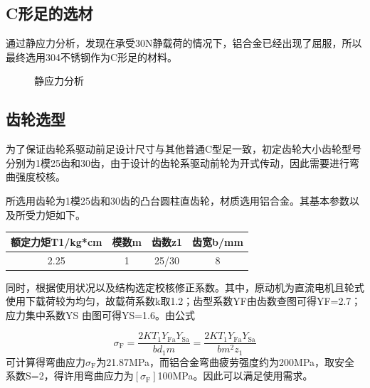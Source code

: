 \documentclass[12pt]{article}
\begin{document}
\begin{CJK}{UTF8}{gbsn}
\subsection{C形足的选材}
通过静应力分析，发现在承受30N静载荷的情况下，铝合金已经出现了屈服，所以最终选用304不锈钢作为C形足的材料。
\begin{figure}[H]
{}
\quad
{}
\caption{静应力分析}
\end{figure}

\subsection{齿轮选型}
为了保证齿轮系驱动前足设计尺寸与其他普通C型足一致，初定齿轮大小齿轮型号分别为1模25齿和30齿，由于设计的齿轮系驱动前轮为开式传动，因此需要进行弯曲强度校核。\par
所选用齿轮为1模25齿和30齿的凸台圆柱直齿轮，材质选用铝合金。其基本参数以及所受力矩如下。\par
\begin{table}[!htbp]
\centering
\begin{tabular}{|c|c|c|c|} %
\hline %
额定力矩T1/kg*cm&模数m&齿数z1&齿宽b/mm\\
\hline
2.25&1&25/30&8\\
\hline
\end{tabular}
\end{table}
同时，根据使用状况以及结构选定校核修正系数。其中，原动机为直流电机且轮式使用下载荷较为均匀，故载荷系数k取1.2；齿型系数YF由齿数查图可得YF=2.7；应力集中系数YS
由图可得YS=1.6。由公式\par
$$\sigma _ { \mathrm { F } } = \frac { 2 K T _ { 1 } Y _ { \mathrm { Fa } } Y _ { \mathrm { Sa } } } { b d _ { 1 } m } = \frac { 2 K T _ { 1 } Y _ { \mathrm { Fa } } Y _ { \mathrm { Sa } } } { b m ^ { 2 } z _ { 1 } } $$
可计算得弯曲应力$\sigma _ { \mathrm { F } } $为21.87MPa，而铝合金弯曲疲劳强度约为200MPa，取安全系数S=2，得许用弯曲应力为$\left[ \sigma _ { \mathrm { F } } \right]$100MPa。因此可以满足使用需求。


\end{CJK}
\end{document}
